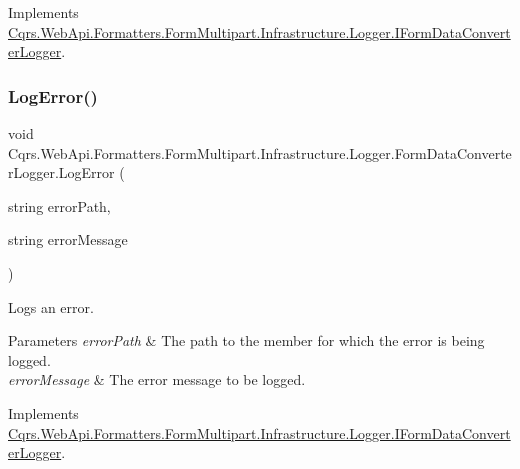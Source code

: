Implements \hyperlink{interfaceCqrs_1_1WebApi_1_1Formatters_1_1FormMultipart_1_1Infrastructure_1_1Logger_1_1IFormDataConverterLogger_a7da0b7749a50f6fed2cb5ab0d8efef2a_a7da0b7749a50f6fed2cb5ab0d8efef2a}{Cqrs.\+Web\+Api.\+Formatters.\+Form\+Multipart.\+Infrastructure.\+Logger.\+I\+Form\+Data\+Converter\+Logger}.

\mbox{\label{classCqrs_1_1WebApi_1_1Formatters_1_1FormMultipart_1_1Infrastructure_1_1Logger_1_1FormDataConverterLogger_a72fcac7560a05dfebbff772a4216a5d8_a72fcac7560a05dfebbff772a4216a5d8}} 
\subsubsection{\texorpdfstring{Log\+Error()}{LogError()}\hspace{0.1cm}{\footnotesize\ttfamily [2/2]}}
{\footnotesize\ttfamily void Cqrs.\+Web\+Api.\+Formatters.\+Form\+Multipart.\+Infrastructure.\+Logger.\+Form\+Data\+Converter\+Logger.\+Log\+Error (\begin{DoxyParamCaption}\item[{string}]{error\+Path,  }\item[{string}]{error\+Message }\end{DoxyParamCaption})}



Logs an error. 


\begin{DoxyParams}{Parameters}
{\em error\+Path} & The path to the member for which the error is being logged.\\
\hline
{\em error\+Message} & The error message to be logged.\\
\hline
\end{DoxyParams}


Implements \hyperlink{interfaceCqrs_1_1WebApi_1_1Formatters_1_1FormMultipart_1_1Infrastructure_1_1Logger_1_1IFormDataConverterLogger_a0067054a5f882d2687e8fd9f9ae38e9b_a0067054a5f882d2687e8fd9f9ae38e9b}{Cqrs.\+Web\+Api.\+Formatters.\+Form\+Multipart.\+Infrastructure.\+Logger.\+I\+Form\+Data\+Converter\+Logger}.

